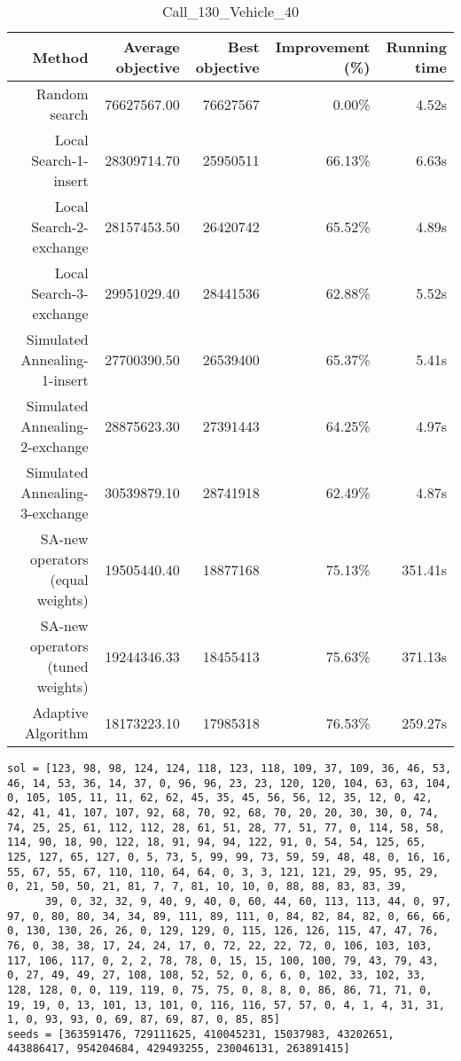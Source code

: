 \begin{table}[ht]
\centering
\caption{Call\_130\_Vehicle\_40}
\label{tab:call130vehicle40}
\begin{tabular}{|r|r|r|r|r|}
Method & Average objective & Best objective & Improvement (\%) & Running time \\
\hline
Random search & 76627567.00 & 76627567 & 0.00\% & 4.52s\\
Local Search-1-insert & 28309714.70 & 25950511 & 66.13\% & 6.63s\\
Local Search-2-exchange & 28157453.50 & 26420742 & 65.52\% & 4.89s\\
Local Search-3-exchange & 29951029.40 & 28441536 & 62.88\% & 5.52s\\
Simulated Annealing-1-insert & 27700390.50 & 26539400 & 65.37\% & 5.41s\\
Simulated Annealing-2-exchange & 28875623.30 & 27391443 & 64.25\% & 4.97s\\
Simulated Annealing-3-exchange & 30539879.10 & 28741918 & 62.49\% & 4.87s\\
SA-new operators (equal weights) & 19505440.40 & 18877168 & 75.13\% & 351.41s\\
SA-new operators (tuned weights) & 19244346.33 & 18455413 & 75.63\% & 371.13s\\
Adaptive Algorithm & 18173223.10 & 17985318 & 76.53\% & 259.27s\\
\end{tabular}%
\end{table}
\begin{lstlisting}[label={lst:call130vehicle40},caption=Optimal solution call\_130\_vehicle\_40]
sol = [123, 98, 98, 124, 124, 118, 123, 118, 109, 37, 109, 36, 46, 53, 46, 14, 53, 36, 14, 37, 0, 96, 96, 23, 23, 120, 120, 104, 63, 63, 104, 0, 105, 105, 11, 11, 62, 62, 45, 35, 45, 56, 56, 12, 35, 12, 0, 42, 42, 41, 41, 107, 107, 92, 68, 70, 92, 68, 70, 20, 20, 30, 30, 0, 74, 74, 25, 25, 61, 112, 112, 28, 61, 51, 28, 77, 51, 77, 0, 114, 58, 58, 114, 90, 18, 90, 122, 18, 91, 94, 94, 122, 91, 0, 54, 54, 125, 65, 125, 127, 65, 127, 0, 5, 73, 5, 99, 99, 73, 59, 59, 48, 48, 0, 16, 16, 55, 67, 55, 67, 110, 110, 64, 64, 0, 3, 3, 121, 121, 29, 95, 95, 29, 0, 21, 50, 50, 21, 81, 7, 7, 81, 10, 10, 0, 88, 88, 83, 83, 39,
      39, 0, 32, 32, 9, 40, 9, 40, 0, 60, 44, 60, 113, 113, 44, 0, 97, 97, 0, 80, 80, 34, 34, 89, 111, 89, 111, 0, 84, 82, 84, 82, 0, 66, 66, 0, 130, 130, 26, 26, 0, 129, 129, 0, 115, 126, 126, 115, 47, 47, 76, 76, 0, 38, 38, 17, 24, 24, 17, 0, 72, 22, 22, 72, 0, 106, 103, 103, 117, 106, 117, 0, 2, 2, 78, 78, 0, 15, 15, 100, 100, 79, 43, 79, 43, 0, 27, 49, 49, 27, 108, 108, 52, 52, 0, 6, 6, 0, 102, 33, 102, 33, 128, 128, 0, 0, 119, 119, 0, 75, 75, 0, 8, 8, 0, 86, 86, 71, 71, 0, 19, 19, 0, 13, 101, 13, 101, 0, 116, 116, 57, 57, 0, 4, 1, 4, 31, 31, 1, 0, 93, 93, 0, 69, 87, 69, 87, 0, 85, 85]
seeds = [363591476, 729111625, 410045231, 15037983, 43202651, 443886417, 954204684, 429493255, 230046131, 263891415]
\end{lstlisting}%
\clearpage


